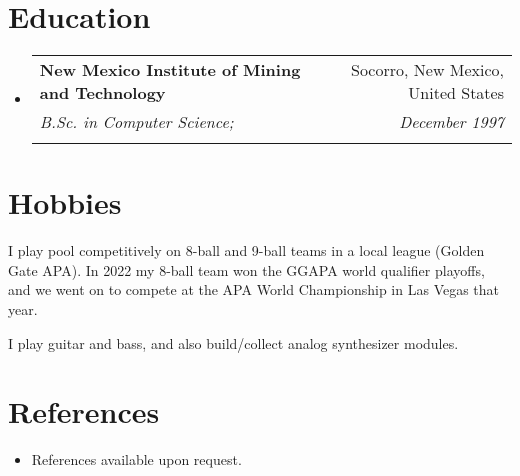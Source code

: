 \documentclass[letterpaper,11pt]{article}
\makeatletter
\newcommand{\resumeEducationHeading}[6]{
  \vspace{-2pt}\item
    \begin{tabular*}{0.97\textwidth}[t]{l@{\extracolsep{\fill}}r}
      \textbf{#1} & #2 \\
      \textit{\small#3} & \textit{\small #4} \\
      \textit{\small#5} & \textit{\small #6} \\
    \end{tabular*}\vspace{-5pt}
}
\newcommand{\resumeSubHeadingListStart}{\begin{itemize}[leftmargin=0.15in, label={}]}
\newcommand{\resumeSubHeadingListEnd}{\end{itemize}}
\makeatother
\begin{document}

\section{Education}
  \vspace{3pt}
  \resumeSubHeadingListStart
    
    \resumeEducationHeading
      {New Mexico Institute of Mining and Technology}{Socorro, New Mexico, United States}
      {B.Sc. in Computer Science;}{December 1997}
      {}
      {}
    
  \resumeSubHeadingListEnd



\section{Hobbies}
  \resumeSubHeadingListStart
    \small{\item{I play pool competitively on 8-ball and 9-ball teams in a local league (Golden Gate APA). In 2022 my 8-ball team won the GGAPA world qualifier playoffs, and we went on to compete at the APA World Championship in Las Vegas that year.}}
    \small{\item{I play guitar and bass, and also build/collect analog synthesizer modules.}}
  \resumeSubHeadingListEnd




\section{References}
  \vspace{2pt}
  \resumeSubHeadingListStart
    \item{References available upon request.}
  \resumeSubHeadingListEnd


\end{document}
